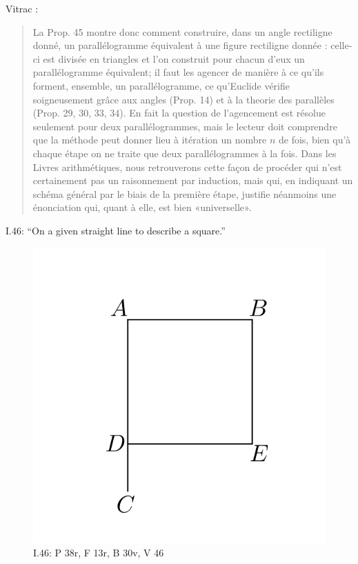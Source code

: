 \documentclass{article}
\begin{document}
Vitrac \cite[p.~278]{vitracI}:

\begin{quote}
La Prop. 45 montre donc comment construire, dans un angle rectiligne
donn\'e, un parall\'elogramme \'equivalent \`a une figure rectiligne donn\'ee : celle-ci
est divis\'ee en triangles et l'on construit pour chacun d'eux un parall\'elogramme
\'equivalent; il faut les agencer de mani\`ere \`a ce qu'ils forment,
ensemble, un parall\'elogramme, ce qu'Euclide v\'erifie soigneusement gr{\^a}ce
aux angles (Prop. 14) et \`a la theorie des parall\`eles (Prop. 29, 30, 33, 34).
En fait la question de l'agencement est r\'esolue seulement pour deux parall\'elogrammes,
mais le lecteur doit comprendre que la m\'ethode peut donner
lieu \`a it\'eration un nombre $n$ de fois, bien qu'\`a chaque \'etape on ne traite
que deux parall\'elogrammes \`a la fois. Dans les Livres arithm\'etiques, nous
retrouverons cette fa{\c c}on de proc\'eder qui n'est certainement pas un raisonnement
par induction, mais qui, en indiquant un sch\'ema g\'en\'eral par le
biais de la premi\`ere \'etape, justifie n\'eanmoins une \'enonciation qui, quant \`a
elle, est bien «universelle».
\end{quote}



I.46: ``On a given straight line to describe a square.''

\begin{figure}
\begin{center}
\includegraphics{I46.png}
\end{center}
\caption{I.46: P 38r, F 13r, B 30v, V 46}
\label{I46}
\end{figure}
\end{document}
